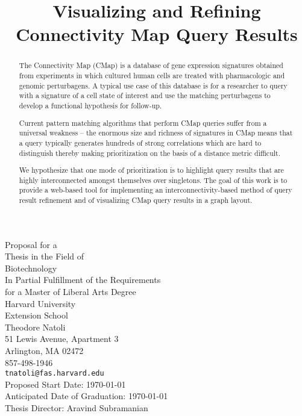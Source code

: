 \documentclass[12pt]{article}
\begin{document}
\title{Visualizing and Refining Connectivity Map Query Results}
\maketitle
\begin{titlepage}
\begin{center}
Proposal for a\\
Thesis in the Field of\\
Biotechnology\\[\baselineskip]
In Partial Fulfillment of the Requirements\\
for a Master of Liberal Arts Degree\\[\baselineskip]
Harvard University\\
Extension School\\[\baselineskip]
Theodore Natoli\\
51 Lewis Avenue, Apartment 3\\
Arlington, MA 02472\\
857-498-1946\\
\texttt{tnatoli@fas.harvard.edu}\\[\baselineskip]
Proposed Start Date: \today\\
Anticipated Date of Graduation: \today\\
Thesis Director: Aravind Subramanian
\end{center}
\end{titlepage}

\begin{abstract}
The Connectivity Map (CMap) is a database of gene expression signatures obtained from experiments in which cultured human cells are treated with pharmacologic and genomic perturbagens. A typical use case of this database is for a researcher to query with a signature of a cell state of interest and use the matching perturbagens to develop a functional hypothesis for follow-up. 

Current pattern matching algorithms that perform CMap queries suffer from a universal weakness -- the enormous size and richness of signatures in CMap means that a query typically generates hundreds of strong correlations which are hard to distinguish thereby making prioritization on the basis of a distance metric difficult.

We hypothesize that one mode of prioritization is to highlight query results that are highly interconnected amongst themselves over singletons. The goal of this work is to provide a web-based tool for implementing an interconnectivity-based method of query result refinement and of visualizing CMap query results in a graph layout.
\end{abstract}
\end{document}
